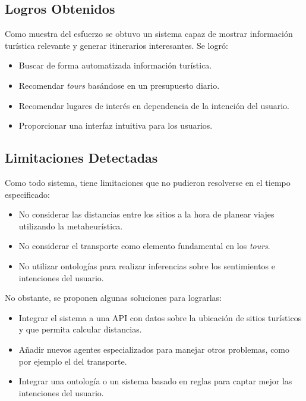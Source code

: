 \documentclass[10pt]{llncs}
\begin{document}
\subsection{Logros Obtenidos}

Como muestra del esfuerzo se obtuvo un sistema capaz de mostrar información turística relevante y generar itinerarios
interesantes. Se logró:

\begin{itemize}
    \item Buscar de forma automatizada información turística.
    \item Recomendar \textit{tours} basándose en un presupuesto diario.
    \item Recomendar lugares de interés en dependencia de la intención del usuario.
    \item Proporcionar una interfaz intuitiva para los usuarios.
\end{itemize}


\subsection{Limitaciones Detectadas}

Como todo sistema, tiene limitaciones que no pudieron resolverse en el tiempo especificado:
\begin{itemize}
    \item No considerar las distancias entre los sitios a la hora de planear viajes utilizando la metaheurística.
    \item No considerar el transporte como elemento fundamental en los \textit{tours}.
    \item No utilizar ontologías para realizar inferencias sobre los sentimientos e intenciones del usuario.
\end{itemize}

No obstante, se proponen algunas soluciones para lograrlas:
\begin{itemize}
    \item Integrar el sistema a una API con datos sobre la ubicación de sitios turísticos y que permita calcular distancias.
    \item Añadir nuevos agentes especializados para manejar otros problemas, como por ejemplo el del transporte.
    \item Integrar una ontología o un sistema basado en reglas para captar mejor las intenciones del usuario.
\end{itemize}

\vspace{\baselineskip}
\end{document}
